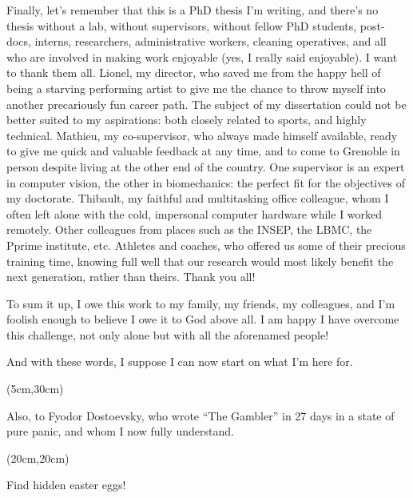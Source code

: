 Finally, let’s remember that this is a PhD thesis I’m writing, and there’s no thesis without a lab, without supervisors, without fellow PhD students, post-docs, interns, researchers, administrative workers, cleaning operatives, and all who are involved in making work enjoyable (yes, I really said enjoyable). I want to thank them all. Lionel, my director, who saved me from the happy hell of being a starving performing artist to give me the chance to throw myself into another precariously fun career path. The subject of my dissertation could not be better suited to my aspirations: both closely related to sports, and highly technical. Mathieu, my co-supervisor, who always made himself available, ready to give me quick and valuable feedback at any time, and to come to Grenoble in person despite living at the other end of the country. One supervisor is an expert in computer vision, the other in biomechanics: the perfect fit for the objectives of my doctorate. Thibault, my faithful and multitasking office colleague, whom I often left alone with the cold, impersonal computer hardware while I worked remotely. Other colleagues from places such as the INSEP, the LBMC, the Pprime institute, etc. Athletes and coaches, who offered us some of their precious training time, knowing full well that our research would most likely benefit the next generation, rather than theirs. Thank you all!

To sum it up, I owe this work to my family, my friends, my colleagues, and I’m foolish enough to believe I owe it to God above all. I am happy I have overcome this challenge, not only alone but with all the aforenamed people!

And with these words, I suppose I can now start on what I’m here for.

\begin{textblock*}{10cm}(5cm,30cm) %
      \begin{turn}{0} 
      \scriptsize Also, to Fyodor Dostoevsky, who wrote “The Gambler” in 27 days in a state of pure panic, and whom I now fully understand. \newline
      \end{turn}
\end{textblock*}

\begin{textblock*}{10cm}(20cm,20cm) %
      \begin{turn}{90} 
            \normalsize \emojiegg
            \scriptsize Find hidden easter eggs! 
      \end{turn}
\end{textblock*}